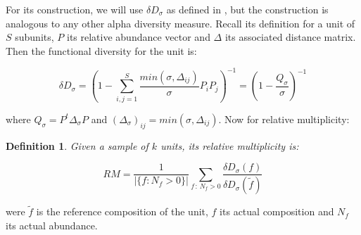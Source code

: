 \documentclass{article}
\newtheorem{definition}{Definition}
\begin{document}
For its construction, we will use $\delta D_\sigma$ as defined in \citep{GonzalezCasabianca2026multiplicity}, but the construction is analogous to any other alpha diversity measure. Recall its definition for a unit of $S$ subunits, $P$ its relative abundance vector and $\Delta$ its associated distance matrix. Then the functional diversity for the unit is: 

$$
\delta D_\sigma =  \left( 1-\sum\limits_{i,j = 1}^S \frac{min(\sigma, \Delta_{ij})}{\sigma} P_iP_j \right)^{-1} = \left(1-\frac{Q_\sigma}{\sigma} \right)^{-1}
$$

where $Q_\sigma = P^t \Delta_\sigma P$ and $(\Delta_\sigma)_{ij} = min(\sigma, \Delta_{ij})$. Now for relative multiplicity:

\begin{definition}
  Given a sample of $k$ units, its relative multiplicity is:

$$
RM = \frac{1}{\left|\{ f : N_f > 0 \}\right|} \sum_{f \,:\, N_f > 0} \frac{\delta D_\sigma (f)}{\delta D_\sigma (\tilde{f})}
$$
  
  \label{def:relative_multipplicity}
\end{definition}

were $\tilde{f}$ is the reference composition of the unit, $f$ its  actual composition and $N_f$ its actual abundance.








\end{document}
